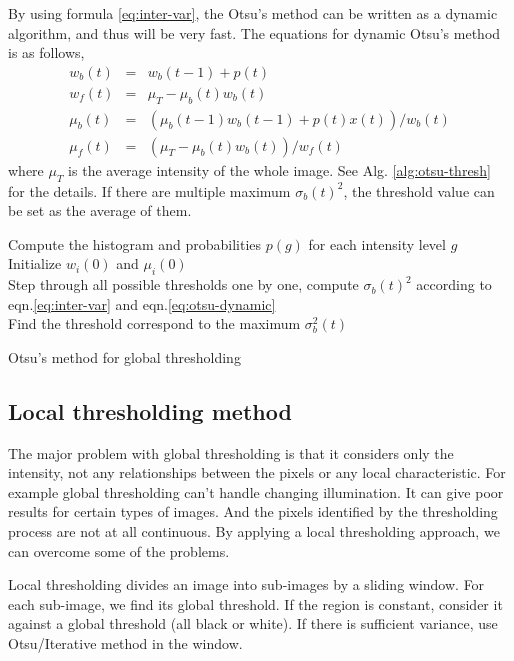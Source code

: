 By using formula \ref{eq:inter-var}, the Otsu's method can be written as a dynamic algorithm, and thus will be very fast. The equations for dynamic Otsu's method is as follows, 
\begin{equation} \label{eq:otsu-dynamic}
\begin{array}{lll}
	w_b(t) & = & w_b(t-1) + p(t) \\
	w_f(t) & = & \mu_T - \mu_b(t)w_b(t) \\
	\mu_b(t) & = & (\mu_b(t-1)w_b(t-1) + p(t)x(t))/w_b(t)\\
	\mu_f(t) & = & (\mu_T - \mu_b(t)w_b(t))/w_f(t)
\end{array}
\end{equation}
where $\mu_T$ is the average intensity of the whole image. See Alg. \ref{alg:otsu-thresh} for the details. If there are multiple maximum $\sigma_b(t)^2$, the threshold value can be set as the average of them.
\begin{algorithm}
\SetAlgoLined
{}
Compute the histogram and probabilities $p(g)$ for each intensity level $g$\\
Initialize $w_i(0)$ and $\mu_i(0)$\\
Step through all possible thresholds one by one, compute $\sigma_b(t)^2$ according to eqn.\ref{eq:inter-var} and eqn.\ref{eq:otsu-dynamic}\\
Find the threshold correspond to the maximum $\sigma_b^2(t)$
\caption{Otsu's method for global thresholding}
\label{alg:otsu-thresh}
\end{algorithm}
\subsection{Local thresholding method}
The major problem with global thresholding is that it considers only the intensity, not any relationships between the pixels or any local characteristic. For example global thresholding can't handle changing illumination. It can give poor results for certain types of images. And the pixels identified by the thresholding process are not at all continuous. By applying a local thresholding approach, we can overcome some of the problems.

Local thresholding divides an image into sub-images by a sliding window. For each sub-image, we find its global threshold. If the region is constant, consider it against a global threshold (all black or white). If there is sufficient variance, use Otsu/Iterative method in the window. 

